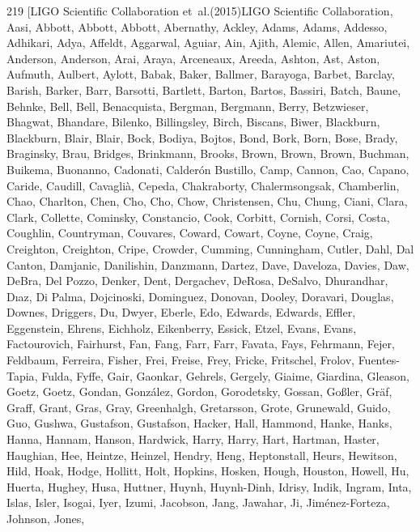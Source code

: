 \documentclass{aa}
\begin{document}
\begin{thebibliography}{219}
	\bibitem[{{LIGO Scientific Collaboration} {et~al.}(2015){LIGO Scientific Collaboration}, {Aasi}, {Abbott}, {Abbott}, {Abbott}, {Abernathy}, {Ackley}, {Adams}, {Adams}, {Addesso}, {Adhikari}, {Adya}, {Affeldt}, {Aggarwal}, {Aguiar}, {Ain}, {Ajith}, {Alemic}, {Allen}, {Amariutei}, {Anderson}, {Anderson}, {Arai}, {Araya}, {Arceneaux}, {Areeda}, {Ashton}, {Ast}, {Aston}, {Aufmuth}, {Aulbert}, {Aylott}, {Babak}, {Baker}, {Ballmer}, {Barayoga}, {Barbet}, {Barclay}, {Barish}, {Barker}, {Barr}, {Barsotti}, {Bartlett}, {Barton}, {Bartos}, {Bassiri}, {Batch}, {Baune}, {Behnke}, {Bell}, {Bell}, {Benacquista}, {Bergman}, {Bergmann}, {Berry}, {Betzwieser}, {Bhagwat}, {Bhandare}, {Bilenko}, {Billingsley}, {Birch}, {Biscans}, {Biwer}, {Blackburn}, {Blackburn}, {Blair}, {Blair}, {Bock}, {Bodiya}, {Bojtos}, {Bond}, {Bork}, {Born}, {Bose}, {Brady}, {Braginsky}, {Brau}, {Bridges}, {Brinkmann}, {Brooks}, {Brown}, {Brown}, {Brown}, {Buchman}, {Buikema}, {Buonanno}, {Cadonati}, {Calder{\'o}n Bustillo}, {Camp}, {Cannon}, {Cao},
		{Capano}, {Caride}, {Caudill}, {Cavagli{\`a}}, {Cepeda}, {Chakraborty}, {Chalermsongsak}, {Chamberlin}, {Chao}, {Charlton}, {Chen}, {Cho}, {Cho}, {Chow}, {Christensen}, {Chu}, {Chung}, {Ciani}, {Clara}, {Clark}, {Collette}, {Cominsky}, {Constancio}, {Cook}, {Corbitt}, {Cornish}, {Corsi}, {Costa}, {Coughlin}, {Countryman}, {Couvares}, {Coward}, {Cowart}, {Coyne}, {Coyne}, {Craig}, {Creighton}, {Creighton}, {Cripe}, {Crowder}, {Cumming}, {Cunningham}, {Cutler}, {Dahl}, {Dal Canton}, {Damjanic}, {Danilishin}, {Danzmann}, {Dartez}, {Dave}, {Daveloza}, {Davies}, {Daw}, {DeBra}, {Del Pozzo}, {Denker}, {Dent}, {Dergachev}, {DeRosa}, {DeSalvo}, {Dhurandhar}, {D{\textasciiacute}{\i}az}, {Di Palma}, {Dojcinoski}, {Dominguez}, {Donovan}, {Dooley}, {Doravari}, {Douglas}, {Downes}, {Driggers}, {Du}, {Dwyer}, {Eberle}, {Edo}, {Edwards}, {Edwards}, {Effler}, {Eggenstein}, {Ehrens}, {Eichholz}, {Eikenberry}, {Essick}, {Etzel}, {Evans}, {Evans}, {Factourovich}, {Fairhurst}, {Fan}, {Fang}, {Farr}, {Farr}, {Favata}, {Fays},
		{Fehrmann}, {Fejer}, {Feldbaum}, {Ferreira}, {Fisher}, {Frei}, {Freise}, {Frey}, {Fricke}, {Fritschel}, {Frolov}, {Fuentes-Tapia}, {Fulda}, {Fyffe}, {Gair}, {Gaonkar}, {Gehrels}, {Gergely}, {Giaime}, {Giardina}, {Gleason}, {Goetz}, {Goetz}, {Gondan}, {Gonz{\'a}lez}, {Gordon}, {Gorodetsky}, {Gossan}, {Go{\ss}ler}, {Gr{\"a}f}, {Graff}, {Grant}, {Gras}, {Gray}, {Greenhalgh}, {Gretarsson}, {Grote}, {Grunewald}, {Guido}, {Guo}, {Gushwa}, {Gustafson}, {Gustafson}, {Hacker}, {Hall}, {Hammond}, {Hanke}, {Hanks}, {Hanna}, {Hannam}, {Hanson}, {Hardwick}, {Harry}, {Harry}, {Hart}, {Hartman}, {Haster}, {Haughian}, {Hee}, {Heintze}, {Heinzel}, {Hendry}, {Heng}, {Heptonstall}, {Heurs}, {Hewitson}, {Hild}, {Hoak}, {Hodge}, {Hollitt}, {Holt}, {Hopkins}, {Hosken}, {Hough}, {Houston}, {Howell}, {Hu}, {Huerta}, {Hughey}, {Husa}, {Huttner}, {Huynh}, {Huynh-Dinh}, {Idrisy}, {Indik}, {Ingram}, {Inta}, {Islas}, {Isler}, {Isogai}, {Iyer}, {Izumi}, {Jacobson}, {Jang}, {Jawahar}, {Ji}, {Jim{\'e}nez-Forteza}, {Johnson}, {Jones},
}
\end{thebibliography}
\end{document}
